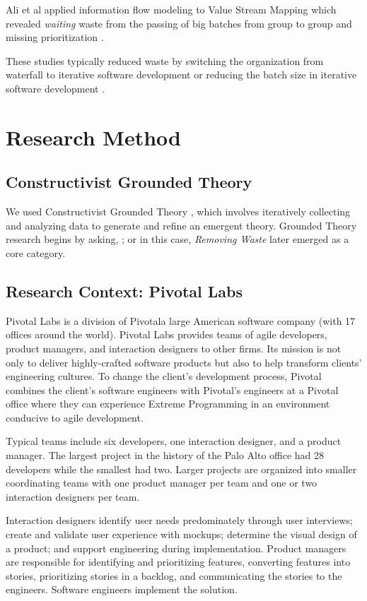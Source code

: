 Ali et al applied information flow modeling to Value Stream Mapping which revealed \textit{waiting} waste from the passing of big batches from group to group and missing prioritization \cite{Ali2016}.

These studies typically reduced waste by switching the organization from waterfall to iterative software development or reducing the batch size in iterative software development \cite{Ali2016, Khurum2014, Mujtaba2010}.
\section{Research Method}
\label{ResearchMethod}
\subsection{Constructivist Grounded Theory}
We used Constructivist Grounded Theory \cite{Charmaz}, which involves iteratively collecting and analyzing data to generate and refine an emergent theory. Grounded Theory research begins by asking,  \cite{GlaserTheoreticalSensitivity}; or in this case,  \textit{Removing Waste}  later emerged as a core category.
\subsection{Research Context: Pivotal Labs}
Pivotal Labs is a division of Pivotal\textemdash a large American software company (with 17 offices around the world). Pivotal Labs provides teams of agile developers, product managers, and interaction designers to other firms. Its mission is not only to deliver highly-crafted software products but also to help transform clients' engineering cultures. To change the client's development process, Pivotal combines the client's software engineers with Pivotal's engineers at a Pivotal office where they can experience Extreme Programming \cite{BeckExtremeProgramming2004} in an environment conducive to agile development. 

Typical teams include six developers, one interaction designer, and a product manager. The largest project in the history of the Palo Alto office had 28 developers while the smallest had two. Larger projects are organized into smaller coordinating teams with one product manager per team and one or two interaction designers per team.

Interaction designers identify user needs predominately through user interviews; create and validate user experience with mockups; determine the visual design of a product; and support engineering during implementation. Product managers are responsible for identifying and prioritizing features, converting features into stories, prioritizing stories in a backlog, and communicating the stories to the engineers. Software engineers implement the solution. 

